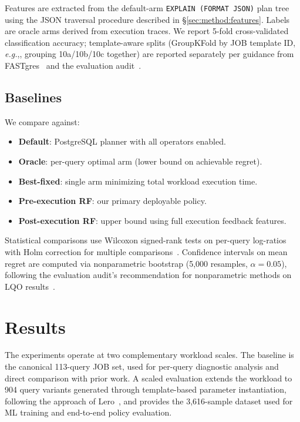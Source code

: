 \documentclass[sigconf,natbib=false]{article}
\newcommand{\postgres}{PostgreSQL}
\newcommand{\eg}{\textit{e.g.},}
\begin{document}
Features are extracted from the default-arm \texttt{EXPLAIN (FORMAT JSON)} plan tree using
the JSON traversal procedure described in \S\ref{sec:method:features}. Labels are oracle
arms derived from execution traces. We report 5-fold cross-validated classification accuracy;
template-aware splits (GroupKFold by JOB template ID, \eg, grouping 10a/10b/10c together)
are reported separately per guidance from FASTgres~\cite{Habich2023} and the evaluation
audit~\cite{Lehmann2024}.

\subsection{Baselines}

We compare against:
\begin{itemize}[noitemsep,topsep=2pt,leftmargin=*]
  \item \textbf{Default}: \postgres{} planner with all operators enabled.
  \item \textbf{Oracle}: per-query optimal arm (lower bound on achievable regret).
  \item \textbf{Best-fixed}: single arm minimizing total workload execution time.
  \item \textbf{Pre-execution RF}: our primary deployable policy.
  \item \textbf{Post-execution RF}: upper bound using full execution feedback features.
\end{itemize}

Statistical comparisons use Wilcoxon signed-rank tests on per-query log-ratios with Holm
correction for multiple comparisons~\cite{Holm1979}. Confidence intervals on mean regret
are computed via nonparametric bootstrap (5{,}000 resamples, $\alpha=0.05$), following the
evaluation audit's recommendation for nonparametric methods on LQO results~\cite{Lehmann2024}.

\section{Results}
\label{sec:results}

The experiments operate at two complementary workload scales. The baseline is the canonical
113-query JOB set, used for per-query diagnostic analysis and direct comparison with prior
work. A scaled evaluation extends the workload to 904 query variants generated through
template-based parameter instantiation, following the approach of Lero~\cite{Zhu2023Lero},
and provides the 3{,}616-sample dataset used for ML training and end-to-end policy evaluation.
\end{document}
